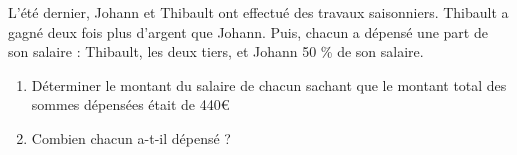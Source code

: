 
\begin{exercice}\label{exosmath-0327}

L'été dernier, Johann et Thibault ont effectué des
  travaux saisonniers. Thibault a gagné deux fois plus d'argent que
  Johann. Puis, chacun a dépensé une part de son salaire : Thibault,
  les deux tiers, et Johann 50 \% de son salaire.

  \begin{enumerate}
  \item Déterminer le montant du salaire de chacun sachant que le
    montant total des sommes dépensées était de 440€
  \item Combien chacun a-t-il dépensé ?
  \end{enumerate}

\end{exercice}
